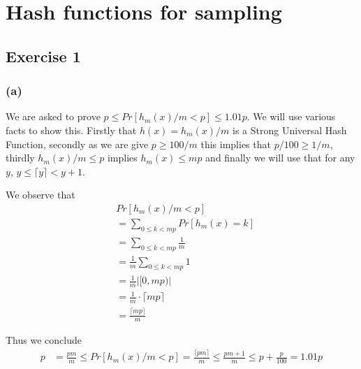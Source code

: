 \section{Hash functions for sampling}
\subsection{Exercise 1}
\subsubsection{(a)}

We are asked to prove \(p \leq Pr[h_m(x)/m < p] \leq 1.01p\).
We will use various facts to show this. Firstly that \(h(x) = h_m(x)/m\) is a Strong Universal Hash Function, secondly as we are give \(p \ge 100/m \) this implies that \(p/100\ge 1/m\), thirdly \(h_m(x)/m \le p \) implies \(h_m(x) \le mp  \)  and finally we will use that for any \(y\),   \(y \leq \lceil y \rceil < y+1\).

We observe that
\begin{align*}
	& Pr[h_m(x)/m < p] \\
	&= \sum_{0 \leq k < mp} Pr[h_m(x) = k] \\
	&= \sum_{0 \leq k < mp} \frac{1}{m} \\
	&= \frac{1}{m} \sum_{0 \leq k < mp} 1 \\
	&= \frac{1}{m} \left| [0,mp) \right| \\
	&= \frac{1}{m} \cdot \lceil mp \rceil \\
	&= \frac{\lceil mp \rceil}{m}
\end{align*}

Thus we conclude
\begin{align*}
	p 	&= \frac{pm}{m} \leq Pr[h_m(x)/m < p] = \frac{\lceil pm \rceil}{m} \leq \frac{pm+1}{m} 
		\leq p + \frac{p}{100} = 1.01p
\end{align*}


